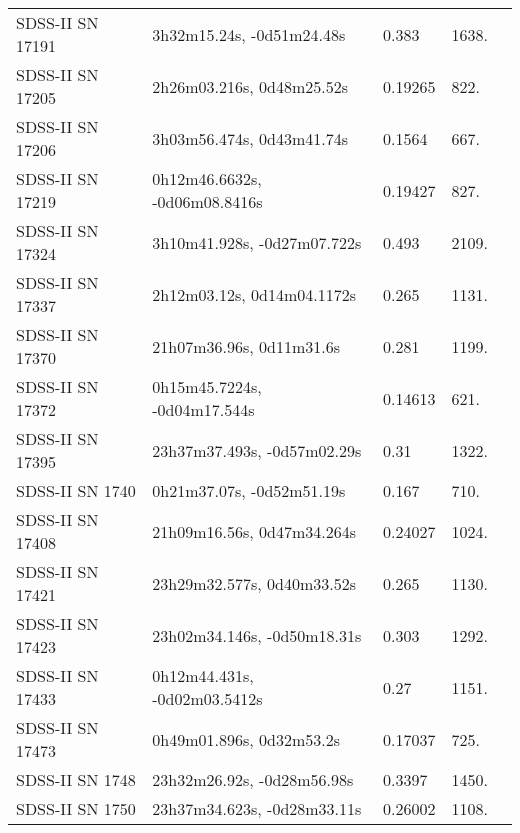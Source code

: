 \begin{longtable}{lllll}
 SDSS-II SN 17191 &      3h32m15.24s, -0d51m24.48s &    0.383 &          1638. &    \citet{2011ApJ...738..162S} \\
 SDSS-II SN 17205 &      2h26m03.216s, 0d48m25.52s &  0.19265 &           822. &    \citet{2000ApJS..129..475Y} \\
 SDSS-II SN 17206 &      3h03m56.474s, 0d43m41.74s &   0.1564 &           667. &    \citet{2011ApJ...738..162S} \\
 SDSS-II SN 17219 &  0h12m46.6632s, -0d06m08.8416s &  0.19427 &           827. &    \citet{2016SDSSD.C...0000:} \\
 SDSS-II SN 17324 &    3h10m41.928s, -0d27m07.722s &    0.493 &          2109. &    \citet{2011ApJ...738..162S} \\
 SDSS-II SN 17337 &     2h12m03.12s, 0d14m04.1172s &    0.265 &          1131. &    \citet{2011ApJ...738..162S} \\
 SDSS-II SN 17370 &       21h07m36.96s, 0d11m31.6s &    0.281 &          1199. &    \citet{2011ApJ...738..162S} \\
 SDSS-II SN 17372 &   0h15m45.7224s, -0d04m17.544s &  0.14613 &           621. &    \citet{2016SDSSD.C...0000:} \\
 SDSS-II SN 17395 &    23h37m37.493s, -0d57m02.29s &     0.31 &          1322. &    \citet{2011ApJ...738..162S} \\
  SDSS-II SN 1740 &      0h21m37.07s, -0d52m51.19s &    0.167 &           710. &    \citet{2010ApJ...713.1026D} \\
 SDSS-II SN 17408 &     21h09m16.56s, 0d47m34.264s &  0.24027 &          1024. &    \citet{2016SDSSD.C...0000:} \\
 SDSS-II SN 17421 &     23h29m32.577s, 0d40m33.52s &    0.265 &          1130. &    \citet{2011ApJ...738..162S} \\
 SDSS-II SN 17423 &    23h02m34.146s, -0d50m18.31s &    0.303 &          1292. &    \citet{2011ApJ...738..162S} \\
 SDSS-II SN 17433 &   0h12m44.431s, -0d02m03.5412s &     0.27 &          1151. &    \citet{2011ApJ...738..162S} \\
 SDSS-II SN 17473 &       0h49m01.896s, 0d32m53.2s &  0.17037 &           725. &    \citet{2016SDSSD.C...0000:} \\
  SDSS-II SN 1748 &     23h32m26.92s, -0d28m56.98s &   0.3397 &          1450. &    \citet{2011ApJ...738..162S} \\
  SDSS-II SN 1750 &    23h37m34.623s, -0d28m33.11s &  0.26002 &          1108. &    \citet{2016SDSSD.C...0000:} \\

\end{longtable}
